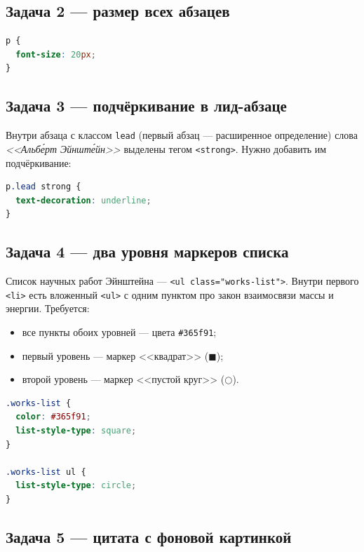 \subsection{Задача 2 --- размер всех абзацев}

\begin{lstlisting}[language=CSS]
p {
  font-size: 20px;
}
\end{lstlisting}

\subsection{Задача 3 --- подчёркивание в лид-абзаце}

Внутри абзаца с классом \texttt{lead} (первый абзац --- расширенное
определение) слова \textit{<<Альбе́рт Эйнште́йн>>} выделены тегом
\texttt{<strong>}. Нужно добавить им подчёркивание:

\begin{lstlisting}[language=CSS]
p.lead strong {
  text-decoration: underline;
}
\end{lstlisting}

\subsection{Задача 4 --- два уровня маркеров списка}

Список научных работ Эйнштейна --- \texttt{<ul~class="works-list">}.
Внутри первого \texttt{<li>} есть вложенный \texttt{<ul>} с одним
пунктом про закон взаимосвязи массы и энергии. Требуется:
\begin{itemize}
  \item все пункты обоих уровней --- цвета \texttt{\#365f91};
  \item первый уровень --- маркер <<квадрат>> ($\blacksquare$);
  \item второй уровень --- маркер <<пустой круг>> ($\bigcirc$).
\end{itemize}

\begin{lstlisting}[language=CSS]
.works-list {
  color: #365f91;
  list-style-type: square;
}

.works-list ul {
  list-style-type: circle;
}
\end{lstlisting}

\subsection{Задача 5 --- цитата с фоновой картинкой}

